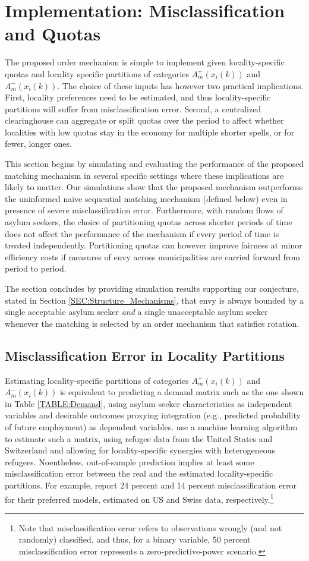 \documentclass[12pt,fleqn]{article}
\begin{document}
\section{Implementation: Misclassification and Quotas}\label{SEC:simulations}
The proposed order mechanism is simple to implement given locality-specific quotas and locality specific partitions of categories $A^+_m(x_i(k))$ and $A^-_m(x_i(k))$. The choice of these inputs has however two practical implications. First, locality preferences need to be estimated, and thus locality-specific partitions will suffer from misclassification error. Second, a centralized clearinghouse can aggregate or split quotas over the period to affect whether localities with low quotas stay in the economy for multiple shorter spells, or for fewer, longer ones.

This section begins by simulating and evaluating the performance of the proposed matching mechanism in several specific settings where these implications are likely to matter. Our simulations show that the proposed mechanism outperforms the uninformed na\"{i}ve sequential matching mechanism (defined below) even in presence of severe misclassification error. Furthermore, with random flows of asylum seekers, the choice of partitioning quotas across shorter periods of time does not affect the performance of the mechanism if every period of time is treated independently. Partitioning quotas can however improve fairness at minor efficiency costs if measures of envy across municipalities are carried forward from period to period. 

The section concludes by providing simulation results supporting our conjecture, stated in Section \ref{SEC:Structure_Mechanisms}, that envy is always bounded by a single acceptable asylum seeker \emph{and} a single unacceptable asylum seeker whenever the matching is selected by an order mechanism that satisfies rotation.

\subsection{Misclassification Error in Locality Partitions}
Estimating locality-specific partitions of categories $A^+_m(x_i(k))$ and $A^-_m(x_i(k))$ is equivalent to predicting a demand matrix such as the one shown in Table \ref{TABLE:Demand}, using asylum seeker characteristics as independent variables and desirable outcomes proxying integration (e.g., predicted probability of future employment) as dependent variables. \cite{bib:BansakEtAl} use a machine learning algorithm to estimate such a matrix, using refugee data from the United States and Switzerland and allowing for locality-specific synergies with heterogeneous refugees. Noentheless, out-of-sample prediction implies at least some misclassification error between the real and the estimated locality-specific partitions. For example, \cite{bib:BansakEtAl} report 24 percent and 14 percent misclassification error for their preferred models, estimated on US and Swiss data, respectively.\footnote{Note that misclassification error refers to observations wrongly (and not randomly) classified, and thus, for a binary variable, 50 percent misclassification error represents a zero-predictive-power scenario.}
\end{document}

